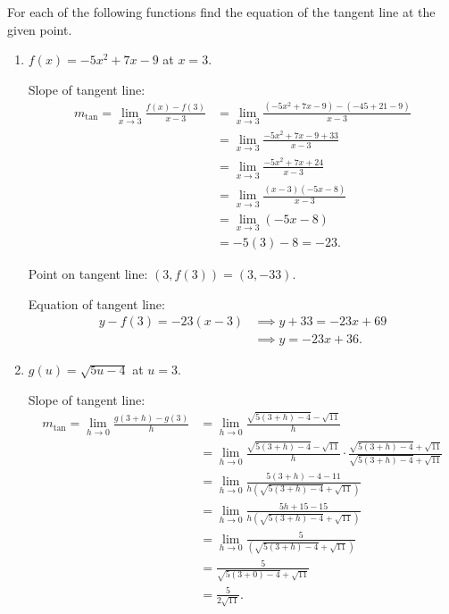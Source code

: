 \documentclass[nooutcomes, handout]{ximera}
\begin{document}
\begin{problem}
 For each of the following functions find the equation of the tangent line at the given point.
  \begin{enumerate}
    \item
      $f(x) = -5x^2 + 7x - 9$ at $x = 3$.
      \begin{freeResponse}
        Slope of tangent line:
        \begin{align*}
          m_{\mathrm{tan}} = \lim_{x \to 3} \frac{f(x) -f(3)}{x-3}
		&= \lim_{x \to 3} \frac{(-5x^2 + 7x - 9) - (-45 + 21 - 9)}{x-3}  \\
		&= \lim_{x \to 3} \frac{-5x^2 + 7x - 9 + 33}{x-3}  \\
		&= \lim_{x \to 3} \frac{-5x^2 + 7x + 24}{x-3}  \\
		&= \lim_{x \to 3} \frac{(x-3)(-5x -8)}{x-3}  \\
		&= \lim_{x \to 3} (-5x - 8)  \\
		&= -5(3) - 8 = -23.
	\end{align*}
        
        Point on tangent line: $(3, f(3)) = (3, -33)$.

        Equation of tangent line:
        \begin{align*}
          y - f(3) = -23(x-3) &\implies y + 33 = -23x + 69\\
          &\implies y = -23x + 36.
        \end{align*}
      \end{freeResponse}

    \item
      $g(u) = \sqrt{5u-4}$ at $u = 3$.
      \begin{freeResponse}
        Slope of tangent line:
        \begin{align*}
          m_{\mathrm{tan}} = \lim_{h \to 0} \frac{g(3+h) - g(3)}{h}
            &= \lim_{h \to 0} \frac{\sqrt{5(3+h) - 4} - \sqrt{11}}{h}\\
          		&=\lim_{h \to 0} \frac{\sqrt{5(3+h) - 4} - \sqrt{11}}{h} \cdot \frac{\sqrt{5(3+h) - 4} + \sqrt{11}}{\sqrt{5(3+h) - 4} + \sqrt{11}} \\
		&= \lim_{h \to 0} \frac{5(3+h) - 4 - 11}{h \left( \sqrt{5(3+h) - 4} + \sqrt{11} \right) }  \\
		&= \lim_{h \to 0} \frac{5h + 15 - 15}{h \left( \sqrt{5(3+h) - 4} + \sqrt{11} \right) }  \\
		&= \lim_{h \to 0} \frac{5}{\left( \sqrt{5(3+h) - 4} + \sqrt{11} \right) }  \\
		&= \frac{5}{\sqrt{5(3+0) - 4} + \sqrt{11}}  \\
		&= \frac{5}{2 \sqrt{11}}.
        \end{align*}


\end{freeResponse}
\end{enumerate}
\end{problem}
\end{document}
